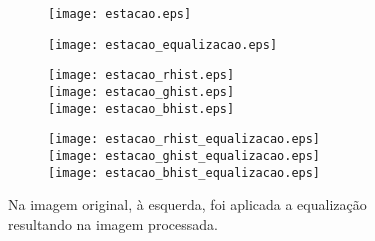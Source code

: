 \documentclass[a4paper,12pt]{article}
\begin{document}
\begin{figure}[h!]
  \begin{subfigure}[b]{0.4\textwidth}
    \texttt{[image: estacao.eps]}
    \label{fig1:A}
  \end{subfigure}
  \begin{subfigure}[b]{0.4\textwidth}
    \texttt{[image: estacao\_equalizacao.eps]}
    \label{fig1:B}
  \end{subfigure}
\end{figure}
\setcounter{figure}{2}
\begin{figure}[h!]
  \begin{subfigure}[b]{0.5\textwidth}
    \texttt{[image: estacao\_rhist.eps]}\\
    \texttt{[image: estacao\_ghist.eps]}\\
    \texttt{[image: estacao\_bhist.eps]}
    \label{fig1:A}
  \end{subfigure}
  \begin{subfigure}[b]{0.4\textwidth}
    \texttt{[image: estacao\_rhist\_equalizacao.eps]}\\
    \texttt{[image: estacao\_ghist\_equalizacao.eps]}\\
    \texttt{[image: estacao\_bhist\_equalizacao.eps]}
    \label{fig1:B}
  \end{subfigure}
  \caption{Na imagem original, à esquerda, foi aplicada a equalização
    resultando na imagem processada.}
\end{figure}

\end{document}
